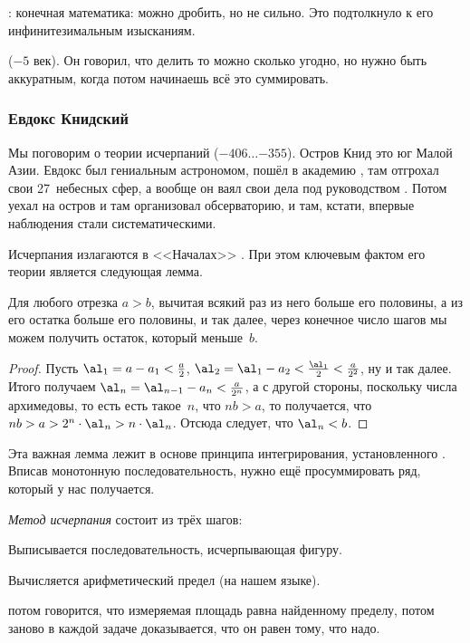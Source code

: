\documentclass[a4paper,oneside,fleqn,10pt]{article}
\newcommand{\pe}[2]{${#1}\ldots{#2}$}
\begin{document}
: конечная математика: можно дробить, но не сильно. Это подтолкнуло 
к его инфинитезимальным изысканиям.

 ($-5$ век). Он говорил, что делить то можно сколько угодно, но нужно быть аккуратным,
когда потом начинаешь всё это суммировать.

\subsubsection{Евдокс Книдский}

Мы поговорим о теории исчерпаний  (\pe{-406}{-355}).
Остров Книд это юг Малой Азии.
Евдокс был гениальным астрономом, пошёл в академию , там отгрохал свои 27~небесных сфер,
а вообще он ваял свои дела под руководством .
Потом уехал на остров и там организовал обсерваторию, и там, кстати, впервые
наблюдения стали систематическими.

Исчерпания излагаются в <<Началах>> .
При этом ключевым фактом его теории является следующая
лемма.

\begin{lemma}
Для любого отрезка $a > b$, вычитая всякий раз из него больше его половины,
а из его остатка больше его половины, и так далее, через конечное число шагов
мы можем получить остаток, который меньше~$b$.
\end{lemma}
\begin{proof}
Пусть $\al_1 = a-a_1 < \frac{a}{2}$,
$\al_2 = \al_1 - a_2 < \frac{\al_1}{2} < \frac{a}{2^2}$,
ну и так далее. Итого получаем
$\al_n = \al_{n-1} - a_n < \frac{a}{2^n}$,
а с другой стороны, поскольку числа архимедовы, то есть есть такое~$n$,
что $nb > a$, то получается, что $nb > a > 2^n \cdot \al_n > n \cdot \al_n$.
Отсюда следует, что $\al_n < b$.
\end{proof}

Эта важная лемма лежит в основе принципа интегрирования, установленного .
Вписав монотонную последовательность, нужно ещё просуммировать ряд, который у нас получается.

\emph{Метод исчерпания} состоит из трёх шагов:

\begin{items}{-2}
\item Выписывается последовательность, исчерпывающая фигуру.
\item Вычисляется арифметический предел (на нашем языке).
\item потом говорится, что измеряемая площадь равна найденному пределу, потом
заново в каждой задаче доказывается, что он равен тому, что надо.
\end{items}
\end{document}
